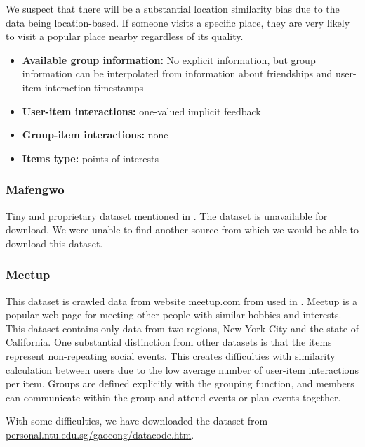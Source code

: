 We suspect that there will be a substantial location similarity bias due to the data being location-based. If someone visits a specific place, they are very likely to visit a popular place nearby regardless of its quality.

\begin{itemize}
    \item \textbf{Available group information:} No explicit information, but group information can be interpolated from information about friendships and user-item interaction timestamps
    \item \textbf{User-item interactions:} one-valued implicit feedback
    \item \textbf{Group-item interactions:} none
    \item \textbf{Items type:} points-of-interests
\end{itemize}


\subsubsection{Mafengwo} \label{subsubsec:04_group_datasets.overview.mafengwo}
Tiny and proprietary dataset mentioned in \cite{attentative_group_recommendation}. The dataset is unavailable for download. We were unable to find another source from which we would be able to download this dataset.


\subsubsection{Meetup} \label{subsubsec:04_group_datasets.overview.meetup}
This dataset is crawled data from website \href{https://www.meetup.com}{meetup.com} from \cite{meetup_origin} used in \cite{meetup_plancast}. Meetup is a popular web page for meeting other people with similar hobbies and interests. This dataset contains only data from two regions, New York City and the state of California. One substantial distinction from other datasets is that the items represent non-repeating social events. This creates difficulties with similarity calculation between users due to the low average number of user-item interactions per item. Groups are defined explicitly with the grouping function, and members can communicate within the group and attend events or plan events together.

With some difficulties, we have downloaded the dataset from
\newline\href{https://personal.ntu.edu.sg/gaocong/datacode.htm}{personal.ntu.edu.sg/gaocong/datacode.htm}.

